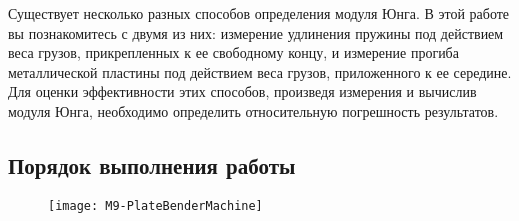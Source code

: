 \documentclass[a4paper, 12pt]{extarticle}
\begin{document}
Существует несколько разных способов определения модуля Юнга. В этой работе вы познакомитесь с двумя из них: измерение удлинения пружины под действием веса грузов, прикрепленных к ее свободному концу, и измерение прогиба металлической пластины под действием веса грузов, приложенного к ее середине. Для оценки эффективности этих способов, произведя измерения и вычислив модуля Юнга, необходимо определить относительную погрешность результатов. %

\subsection{Порядок выполнения работы}

\begin{figure}[h]
\begin{center}
\texttt{[image: M9-PlateBenderMachine]}
\end{center}
\caption{\label{fig:m9b-equipment}}
\end{figure}
\end{document}
